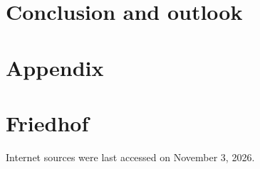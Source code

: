 \documentclass[
class=book,
accentcolor=1b,
custommargins=geometry,
fontsize=11pt,
thesis={type=master, reviewer-on-uppertitleback=true}, %
ruledheaders=all,
headline=false,
instbox=false,
marginpar=false,
title=small,
ignore-missing-data=true,
twoside=true, %
pdfx=false, %
IMRAD = false,
logofile=apqdesign/tuda_logo.pdf
]{apqpub}
\begin{document}
    \chapter{Conclusion and outlook}
    \label{sec:fazit}
    

    \newpage
    
    \appendix
    
    \chapter*{Appendix}
    \clearpage %
    

    \chapter*{Friedhof}
    
    
    \printbibliography
	Internet sources were last accessed on November 3, 2026.
    \cleardoublepage
    \affidavit
\end{document}

